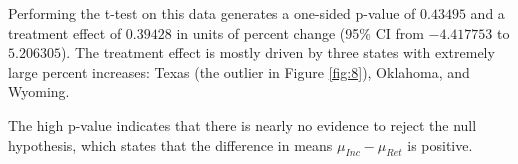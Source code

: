 \documentclass[11pt]{exam} %
\begin{document}
\begin{questions}
Performing the t-test on this data generates a one-sided p-value of $0.43495$ and a treatment effect of $0.39428$ in units of percent change (95\% CI from $-4.417753$ to $5.206305$). The treatment effect is mostly driven by three states with extremely large percent increases: Texas (the outlier in Figure \ref{fig:8}), Oklahoma, and Wyoming.

The high p-value indicates that there is nearly no evidence to reject the null hypothesis, which states that the difference in means $\mu_{Inc} - \mu_{Ret}$ is positive.


\end{questions}

\end{document}
